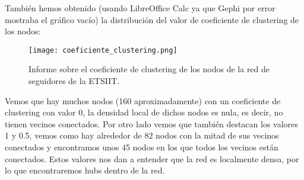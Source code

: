 También hemos obtenido (usando LibreOffice Calc ya que Gephi por error mostraba el gráfico vacío) la distribución del valor de coeficiente de clustering de los nodos:

\begin{figure}[H]
  \centering
  \texttt{[image: coeficiente\_clustering.png]}
  \caption{Informe sobre el coeficiente de clustering de los nodos de la red de seguidores de la ETSIIT.}
  \label{fig:outdegree-coeficiente_clustering}
\end{figure}

Vemos que hay muchos nodos (160 aproximadamente) con un coeficiente de clustering con valor 0, la densidad local de dichos nodos es nula, es decir, no tienen vecinos conectados. Por otro lado vemos que también destacan los valores 1 y 0.5, vemos como hay alrededor de 82 nodos con la mitad de sus vecinos conectados y encontramos unos 45 nodos en los que todos los vecinos están conectados. Estos valores nos dan a entender que la red es localmente densa, por lo que encontraremos hubs dentro de la red.

